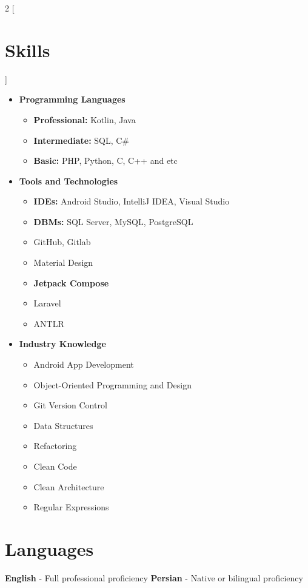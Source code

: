 \begin{multicols}{2}
[\section*{\LARGE{Skills}}]
    \begin{itemize}
        \item \textbf{Programming Languages}
        \begin{itemize}
            \item \textbf{Professional:} Kotlin, Java
            \item \textbf{Intermediate:} SQL, C\#
            \item \textbf{Basic:} PHP, Python, C, C++ and etc
        \end{itemize}
        \item \textbf{Tools and Technologies}
        \begin{itemize}
            \item \textbf{IDEs:} Android Studio, IntelliJ IDEA, Visual Studio
            \item \textbf{DBMs:} SQL Server, MySQL, PostgreSQL
            \item GitHub, Gitlab
            \item Material Design
            \item \textbf{Jetpack Compose}
            \item Laravel
            \item ANTLR
        \end{itemize}
        \item \textbf{Industry Knowledge}
        \begin{itemize}
            \item Android App Development
            \item Object-Oriented Programming and Design
            \item Git Version Control
            \item Data Structures
            \item Refactoring
            \item Clean Code
            \item Clean Architecture
            \item Regular Expressions
        \end{itemize}
    \end{itemize}
\end{multicols}


\section*{Languages}
\textbf{English} - Full professional proficiency \hfill \textbf{Persian} - Native or bilingual proficiency

